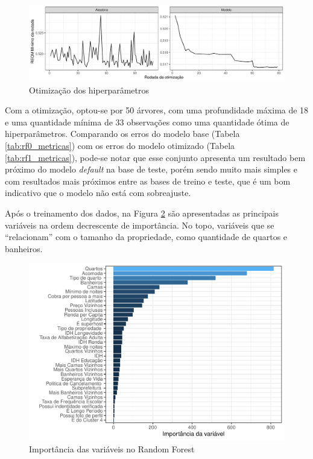 \documentclass[
	12pt,				%
	a4paper,		%
	oneside,    %
	chapter=TITLE,		   %
	section=TITLE,		   %
	subsection=TITLE,	   %
	subsubsection=TITLE, %
	english,			%
	french,				%
	spanish,			%
	brazil,				%
]{abntex2}
\begin{document}
\begin{figure}
\centering
\includegraphics{00-TCC_files/figure-latex/otimizacao-1.pdf}
\caption{\label{otimizacao}Otimização dos hiperparâmetros}
\end{figure}

Com a otimização, optou-se por 50 árvores, com uma profundidade máxima
de 18 e uma quantidade mínima de 33 observações como uma quantidade
ótima de hiperparâmetros. Comparando os erros do modelo base (Tabela
\ref{tab:rf0_metricas}) com os erros do modelo otimizado (Tabela
\ref{tab:rf1_metricas}), pode-se notar que esse conjunto apresenta um
resultado bem próximo do modelo \emph{default} na base de teste, porém
sendo muito mais simples e com resultados mais próximos entre as bases
de treino e teste, que é um bom indicativo que o modelo não está com
sobreajuste.

Após o treinamento dos dados, na Figura \ref{imp_var_rf} são
apresentadas as principais variáveis na ordem decrescente de
importância. No topo, variáveis que se ``relacionam'' com o tamanho da
propriedade, como quantidade de quartos e banheiros.

\begin{figure}
\centering
\includegraphics{00-TCC_files/figure-latex/imp_var_rf-1.pdf}
\caption{\label{imp_var_rf}Importância das variáveis no Random Forest}
\end{figure}
\end{document}
